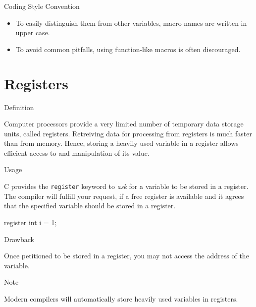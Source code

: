 \documentclass[compress]{beamer}
\begin{document}
\begin{slide}
	\begin{block}{Coding Style Convention}

	\begin{itemize}
	\item[] To easily distinguish them from other variables, macro names are written in upper case.
	\item[] To avoid common pitfalls, using function-like macros is often discouraged.
	\end{itemize}

	\end{block}
\end{slide}


\section{Registers}

\begin{slide}
	\begin{block}{Definition}

	Computer processors provide a very limited number of temporary data storage units, called registers.
	Retreiving data for processing from registers is much faster than from memory.
	Hence, storing a heavily used variable in a register allows efficient access to and manipulation of its value.

	\end{block}
\end{slide}

\begin{slide}
	\begin{block}{Usage}

	C provides the \alert{\texttt{register}} keyword to \emph{ask} for a variable to be stored in a register.
	The compiler will fulfill your request, if a free register is available and it agrees that the specified variable should be stored in a register.

	\begin{terminal}
	register int i = 1;
	\end{terminal}

	\end{block}
\end{slide}

\begin{slide}
	\begin{block}{Drawback}

	Once petitioned to be stored in a register, you may not access the address of the variable.

	\end{block}
\end{slide}

\begin{slide}
	\begin{block}{Note}

	Modern compilers will automatically store heavily used variables in registers.

	\end{block}
\end{slide}
\end{document}
